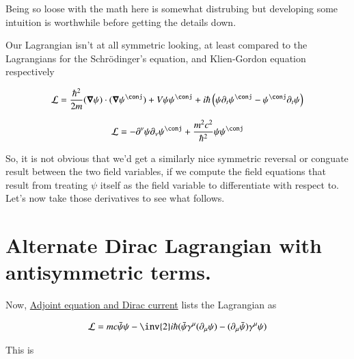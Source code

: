 \documentclass{article}
\begin{document}
Being so loose with the math here is somewhat distrubing but developing some intuition is worthwhile before getting the details down.

Our Lagrangian isn't at all symmetric looking, at least compared to the Lagrangians for the 
Schr\"{o}dinger's equation, and Klien-Gordon equation respectively

\begin{align*}
\LL = \frac{\hbar^2}{2m}
(\spacegrad \psi) \cdot (\spacegrad \psi^\conj) + V \psi \psi^\conj + {i \hbar} \left( \psi \partial_t \psi^\conj - \psi^\conj \partial_t \psi \right)
\end{align*}

\begin{align*}
\LL &= -\partial^\nu \psi \partial_\nu \psi^\conj + \frac{m^2 c^2}{\hbar^2} \psi \psi^\conj \\
\end{align*}

So, it is not obvious that we'd get a similarly nice symmetric reversal or conguate result between the two field variables, if we compute
the field equations that result from treating $\psi$ itself as the field variable to differentiate with respect to.  Let's now take
those derivatives to see what follows.

\section{ Alternate Dirac Lagrangian with antisymmetric terms. }

Now, 
\href{http://en.wikipedia.org/wiki/Dirac_equation#Adjoint_equation_and_Dirac_current}{Adjoint equation and Dirac current} lists the Lagrangian as

\begin{align*}
\LL = mc \bar{\psi}\psi - {\inv{2}i\hbar}(\bar{\psi}\gamma^\mu (\partial_\mu\psi) - (\partial_\mu\bar{\psi})\gamma^\mu \psi)
\end{align*}

This is 

%
%
\end{document}
